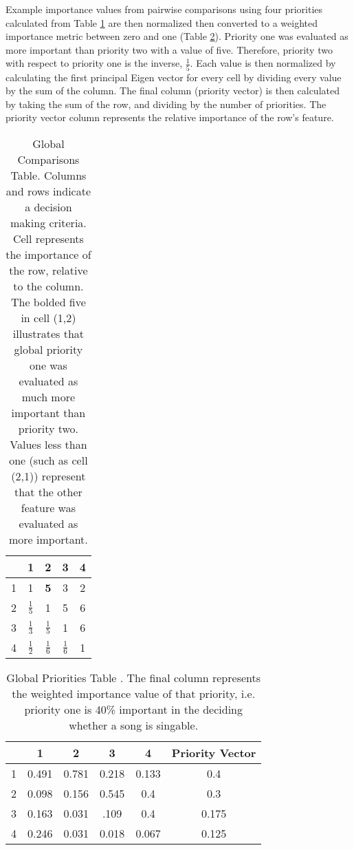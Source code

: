 Example importance values from pairwise comparisons using four priorities calculated from Table \ref{tab:global} are then normalized then converted to a weighted importance metric between zero and one (Table \ref{tab:priorities}). Priority one was evaluated as more important than priority two with a value of five. Therefore, priority two with respect to priority one is the inverse, $\frac{1}{5}$. Each value is then normalized by calculating the first principal Eigen vector for every cell by dividing every value by the sum of the column. The final column (priority vector) is then calculated by taking the sum of the row, and dividing by the number of priorities. The priority vector column represents the relative importance of the row's feature.

\begin{table}
\centering
\begin{tabular}{|c|c|c|c|c|}
\hline
& 1 & 2 & 3 & 4 \\
\hline
1 & 1 & \textbf{5} & 3 & 2 \\
\hline
2 & \textbf{$\frac{1}{5}$} & 1 & 5 & 6 \\
\hline
3 & $\frac{1}{3}$ & $\frac{1}{5}$ & 1 & 6 \\
\hline
4 & $\frac{1}{2}$ & $\frac{1}{6}$ & $\frac{1}{6}$ & 1 \\
\hline
\end{tabular}
\caption{Global Comparisons Table. Columns and rows indicate a decision making criteria. Cell represents the importance of the row, relative to the column. The bolded five in cell (1,2) illustrates that global priority one was evaluated as much more important than priority two. Values less than one (such as cell (2,1)) represent that the other feature was evaluated as more important. \label{tab:global}}
\end{table}

\begin{table}
\centering
\begin{tabular}{|c|c|c|c|c||c|}
\hline
& 1 & 2 & 3 & 4 & Priority Vector  \\
\hline
1 & 0.491 & 0.781 & 0.218 & 0.133 & 0.4 \\
\hline
2 & 0.098 & 0.156 & 0.545 & 0.4 & 0.3 \\
\hline
3 & 0.163 & 0.031 & .109 & 0.4 & 0.175 \\
\hline
4 & 0.246 & 0.031 & 0.018 & 0.067 & 0.125 \\
\hline
\end{tabular}
\caption{Global Priorities Table \label{tab:priorities}. The final column represents the weighted importance value of that priority, i.e. priority one is 40\% important in the deciding whether a song is singable.}
\end{table}



